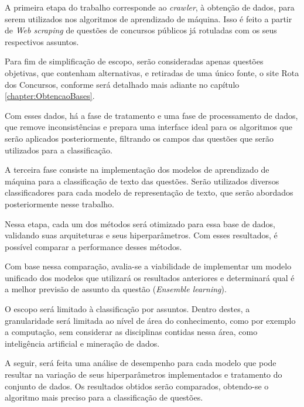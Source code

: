 A primeira etapa do trabalho corresponde ao \textit{crawler}, à obtenção de dados, para serem utilizados nos algoritmos de aprendizado de máquina. Isso é feito a partir de \textit{Web scraping} de questões de concursos públicos já rotuladas com os seus respectivos assuntos.

Para fim de simplificação de escopo, serão consideradas apenas questões objetivas, que contenham alternativas, e retiradas de uma único fonte, o site Rota dos Concursos, conforme será detalhado mais adiante no capítulo \ref{chapter:ObtencaoBases}.

Com esses dados, há a fase de tratamento e uma fase de processamento de dados, que remove inconsistências e prepara uma interface ideal para os algoritmos que serão aplicados posteriormente, filtrando os campos das questões que serão utilizados para a classificação.

A terceira fase consiste na implementação dos modelos de aprendizado de máquina para a classificação de texto das questões. Serão utilizados diversos classificadores para cada modelo de representação de texto, que serão abordados posteriormente nesse trabalho.

Nessa etapa, cada um dos métodos será otimizado para essa base de dados, validando suas arquiteturas e seus hiperparâmetros. Com esses resultados, é possível comparar a performance desses métodos.

Com base nessa comparação, avalia-se a viabilidade de implementar um modelo unificado dos modelos que utilizará os resultados anteriores e determinará qual é a melhor previsão de assunto da questão (\textit{Ensemble learning}).

O escopo será limitado à classificação por assuntos. Dentro destes, a granularidade será limitada ao nível de área do conhecimento, como por exemplo a computação, sem considerar as disciplinas contidas nessa área, como inteligência artificial e mineração de dados.

A seguir, será feita uma análise de desempenho para cada modelo que pode resultar na variação de seus hiperparâmetros implementados e tratamento do conjunto de dados. Os resultados obtidos serão comparados, obtendo-se o algoritmo mais preciso para a classificação de questões.

